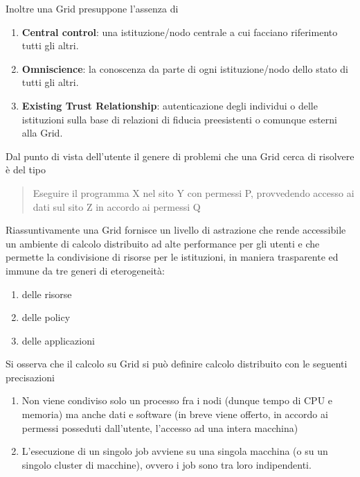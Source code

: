 \documentclass[italian,]{article}
\providecommand{\tightlist}{%
  \setlength{\itemsep}{0pt}\setlength{\parskip}{0pt}}
\begin{document}
Inoltre una Grid presuppone l'assenza di

\begin{enumerate}
\def\labelenumi{\arabic{enumi}.}
\tightlist
\item
  \textbf{Central control}: una istituzione/nodo centrale a cui facciano
  riferimento tutti gli altri.
\item
  \textbf{Omniscience}: la conoscenza da parte di ogni istituzione/nodo
  dello stato di tutti gli altri.
\item
  \textbf{Existing Trust Relationship}: autenticazione degli individui o
  delle istituzioni sulla base di relazioni di fiducia preesistenti o
  comunque esterni alla Grid.
\end{enumerate}

Dal punto di vista dell'utente il genere di problemi che una Grid cerca
di risolvere è del tipo

\begin{quote}
Eseguire il programma X nel sito Y con permessi P, provvedendo accesso
ai dati sul sito Z in accordo ai permessi Q
\end{quote}

Riassuntivamente una Grid fornisce un livello di astrazione che rende
accessibile un ambiente di calcolo distribuito ad alte performance per
gli utenti e che permette la condivisione di risorse per le istituzioni,
in maniera trasparente ed immune da tre generi di eterogeneità:

\begin{enumerate}
\def\labelenumi{\arabic{enumi}.}
\tightlist
\item
  delle risorse
\item
  delle policy
\item
  delle applicazioni
\end{enumerate}

Si osserva che il calcolo su Grid si può definire calcolo distribuito
con le seguenti precisazioni

\begin{enumerate}
\def\labelenumi{\arabic{enumi}.}
\tightlist
\item
  Non viene condiviso solo un processo fra i nodi (dunque tempo di CPU e
  memoria) ma anche dati e software (in breve viene offerto, in accordo
  ai permessi posseduti dall'utente, l'accesso ad una intera macchina)
\item
  L'esecuzione di un singolo job avviene su una singola macchina (o su
  un singolo cluster di macchine), ovvero i job sono tra loro
  indipendenti.
\end{enumerate}
\end{document}
